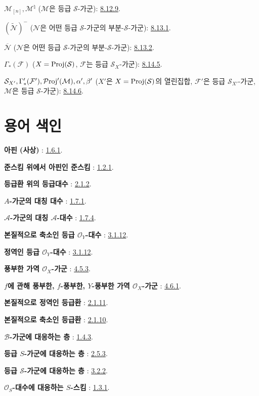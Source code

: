 $\mathcal{M}_{[n]},\mathcal{M}^{\natural}$
($\mathcal{M}$은 등급 $\mathcal{S}$-가군): \hyperref[II.8.12.9-ko]{8.12.9}.

$(\widetilde{\mathcal{N}})^-$
($\mathcal{N}$은 어떤 등급 $\mathcal{S}$-가군의 부분-$\mathcal{S}$-가군): \hyperref[II.8.13.1-ko]{8.13.1}.

$\overline{\mathcal{N}}$
($\mathcal{N}$은 어떤 등급 $\mathcal{S}$-가군의 부분-$\mathcal{S}$-가군): \hyperref[II.8.13.2-ko]{8.13.2}.

$\Gamma_*(\mathcal{F})$
($X=\operatorname{Proj}(\mathcal{S})$, $\mathcal{F}$는 등급 $\mathcal{S}_X$-가군): \hyperref[II.8.14.5-ko]{8.14.5}.

$\mathcal{S}_{X'},\Gamma'_*(\mathcal{F}'),\mathcal{P}\!\operatorname{roj}'(\mathcal{M}),
\alpha',\beta'$
($X'$은 $X=\operatorname{Proj}(\mathcal{S})$의 열린집합, $\mathcal{F}'$은 등급
$\mathcal{S}_{X'}$-가군, $\mathcal{M}$은 등급 $\mathcal{S}$-가군): \hyperref[II.8.14.6-ko]{8.14.6}.

\endgroup

\clearpage
{}
\thispagestyle{plain}
{}
\section*{용어 색인}

\begingroup
\small
\setlength{\parindent}{0pt}
\setlength{\parskip}{2pt}
\newcommand{\egaTerme}[2]{\textbf{#1} : #2.\par}

\egaTerme{아핀 (사상)}{\hyperref[II.1.6.1-ko]{1.6.1}}
\egaTerme{준스킴 위에서 아핀인 준스킴}{\hyperref[II.1.2.1-ko]{1.2.1}}
\egaTerme{등급환 위의 등급대수}{\hyperref[II.2.1.2-ko]{2.1.2}}
\egaTerme{$A$-가군의 대칭 대수}{\hyperref[II.1.7.1-ko]{1.7.1}}
\egaTerme{$\mathcal{A}$-가군의 대칭 $\mathcal{A}$-대수}{\hyperref[II.1.7.4-ko]{1.7.4}}
\egaTerme{본질적으로 축소인 등급 $\mathcal{O}_Y$-대수}{\hyperref[II.3.1.12-ko]{3.1.12}}
\egaTerme{정역인 등급 $\mathcal{O}_Y$-대수}{\hyperref[II.3.1.12-ko]{3.1.12}}
\egaTerme{풍부한 가역 $\mathcal{O}_X$-가군}{\hyperref[II.4.5.3-ko]{4.5.3}}
\egaTerme{$f$에 관해 풍부한, $f$-풍부한, $Y$-풍부한 가역 $\mathcal{O}_X$-가군}{\hyperref[II.4.6.1-ko]{4.6.1}}
\egaTerme{본질적으로 정역인 등급환}{\hyperref[II.2.1.11-ko]{2.1.11}}
\egaTerme{본질적으로 축소인 등급환}{\hyperref[II.2.1.10-ko]{2.1.10}}
\egaTerme{$\mathcal{B}$-가군에 대응하는 층}{\hyperref[II.1.4.3-ko]{1.4.3}}
\egaTerme{등급 $S$-가군에 대응하는 층}{\hyperref[II.2.5.3-ko]{2.5.3}}
\egaTerme{등급 $\mathcal{S}$-가군에 대응하는 층}{\hyperref[II.3.2.2-ko]{3.2.2}}
\egaTerme{$\mathcal{O}_S$-대수에 대응하는 $S$-스킴}{\hyperref[II.1.3.1-ko]{1.3.1}}

